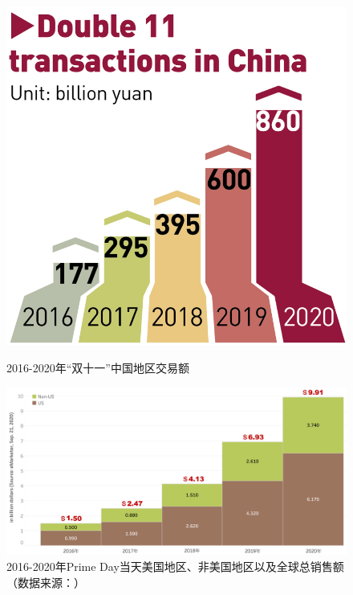 \documentclass[12pt]{ctexart}
\begin{document}
\begin{figure}[htbp!]
    \begin{minipage}[t]{0.3\textwidth}
        \centering
        \includegraphics[width=\textwidth]{Images/1.png}
        \caption{2016-2020年“双十一”中国地区交易额\cite{1}}
        \label{double-ele}
    \end{minipage}
    \hfill
    \begin{minipage}[t]{0.65\textwidth}
        \centering
        \includegraphics[width=\textwidth]{Images/2.png}
        \caption{2016-2020年Prime Day当天美国地区、非美国地区以及全球总销售额（数据来源：\cite{2}）}
        \label{trd}
    \end{minipage}
\end{figure}
\end{document}
